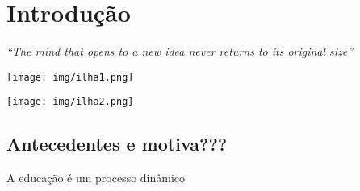 \documentclass[Tese.tex]{subfiles}
\begin{document}
\chapter{Introdução}

\rightline
{\textit{``The mind that opens to a new idea never returns to its original size''}}




\texttt{[image: img/ilha1.png]}

\texttt{[image: img/ilha2.png]}



\section{Antecedentes e motiva???}

A educação é um processo dinâmico 
\end{document}

